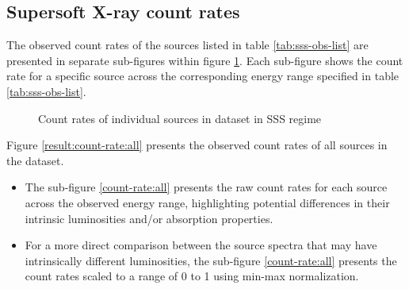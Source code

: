 		\subsection{Supersoft X-ray count rates}
			The observed count rates of the sources listed in table \ref{tab:sss-obs-list} are presented in separate sub-figures within figure \ref{result:count-rate:indiv}. Each sub-figure shows the count rate for a specific source across the corresponding energy range specified in table \ref{tab:sss-obs-list}.
			\begin{figure}[h!]
				\centering
				
				
				\caption{Count rates of individual sources in dataset in SSS regime}
				\label{result:count-rate:indiv}
			\end{figure}
			
			Figure \ref{result:count-rate:all} presents the observed count rates of all sources in the dataset.
			\begin{itemize}
				\item The sub-figure \ref{count-rate:all} presents the raw count rates for each source across the observed energy range, highlighting potential differences in their intrinsic luminosities and/or absorption properties.
				
				\item For a more direct comparison between the source spectra that may have intrinsically different luminosities, the sub-figure \ref{count-rate:all} presents the count rates scaled to a range of 0 to 1 using min-max normalization.%
			\end{itemize}

